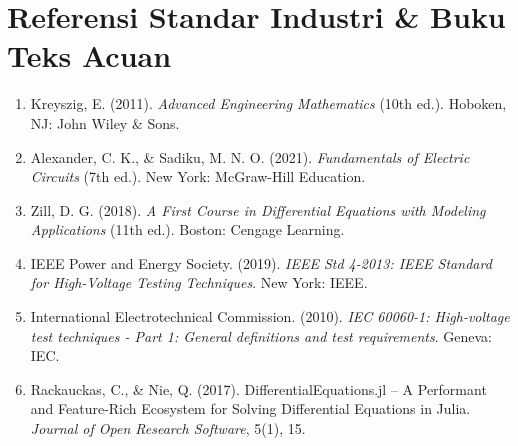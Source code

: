 \documentclass[11pt,a4paper]{article}
\theoremstyle{definition}
\begin{document}
\section{Referensi Standar Industri \& Buku Teks Acuan}
\begin{enumerate}[leftmargin=*]
    \item Kreyszig, E. (2011). \textit{Advanced Engineering Mathematics} (10th ed.). Hoboken, NJ: John Wiley \& Sons.
    \item Alexander, C. K., \& Sadiku, M. N. O. (2021). \textit{Fundamentals of Electric Circuits} (7th ed.). New York: McGraw-Hill Education.
    \item Zill, D. G. (2018). \textit{A First Course in Differential Equations with Modeling Applications} (11th ed.). Boston: Cengage Learning.
    \item IEEE Power and Energy Society. (2019). \textit{IEEE Std 4-2013: IEEE Standard for High-Voltage Testing Techniques}. New York: IEEE.
    \item International Electrotechnical Commission. (2010). \textit{IEC 60060-1: High-voltage test techniques - Part 1: General definitions and test requirements}. Geneva: IEC.
    \item Rackauckas, C., \& Nie, Q. (2017). DifferentialEquations.jl -- A Performant and Feature-Rich Ecosystem for Solving Differential Equations in Julia. \textit{Journal of Open Research Software}, 5(1), 15.
\end{enumerate}
\end{document}
